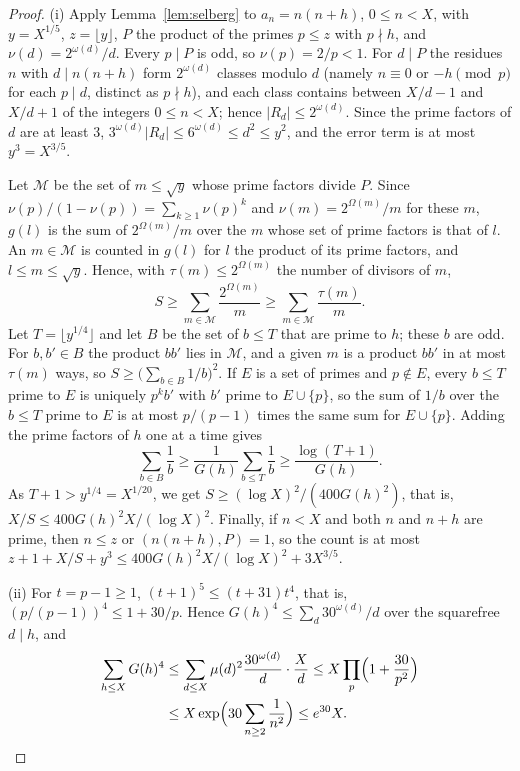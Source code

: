 \documentclass[screen,reqno]{aomart}
\numberwithin{equation}{section}
\theoremstyle{definition}
\begin{document}
\begin{proof}
(i) Apply Lemma~\ref{lem:selberg} to $a_n=n(n+h)$, $0\le n<X$, with $y=X^{1/5}$,
$z=\lfloor y\rfloor$, $P$ the product of the primes $p\le z$ with $p\nmid h$, and
$\nu(d)=2^{\omega(d)}/d$. Every $p\mid P$ is odd, so $\nu(p)=2/p<1$. For $d\mid P$ the residues $n$
with $d\mid n(n+h)$ form $2^{\omega(d)}$ classes modulo $d$ (namely $n\equiv0$ or $-h\pmod p$ for
each $p\mid d$, distinct as $p\nmid h$), and each class contains between $X/d-1$ and $X/d+1$ of
the integers $0\le n<X$; hence $|R_d|\le2^{\omega(d)}$. Since the prime factors of $d$ are at
least $3$, $3^{\omega(d)}|R_d|\le6^{\omega(d)}\le d^2\le y^2$, and the error term is at most
$y^3=X^{3/5}$.

Let $\mathcal M$ be the set of $m\le\sqrt y$ whose prime factors divide $P$. Since
$\nu(p)/(1-\nu(p))=\sum_{k\ge1}\nu(p)^k$ and $\nu(m)=2^{\Omega(m)}/m$ for these $m$, $g(l)$ is the
sum of $2^{\Omega(m)}/m$ over the $m$ whose set of prime factors is that of $l$. An $m\in\mathcal M$
is counted in $g(l)$ for $l$ the product of its prime factors, and $l\le m\le\sqrt y$. Hence,
with $\tau(m)\le2^{\Omega(m)}$ the number of divisors of $m$,
\[
  S\ge\sum_{m\in\mathcal M}\frac{2^{\Omega(m)}}m\ge\sum_{m\in\mathcal M}\frac{\tau(m)}m.
\]
Let $T=\lfloor y^{1/4}\rfloor$ and let $B$ be
the set of $b\le T$ that are prime to $h$; these $b$ are odd. For $b,b'\in B$ the product $bb'$
lies in $\mathcal M$, and a given $m$ is a product $bb'$ in at most $\tau(m)$ ways, so
$S\ge\bigl(\sum_{b\in B}1/b\bigr)^2$. If $E$ is a set of primes and $p\notin E$, every $b\le T$
prime to $E$ is uniquely $p^kb'$ with $b'$ prime to $E\cup\{p\}$, so the sum of $1/b$ over the
$b\le T$ prime to $E$ is at most $p/(p-1)$ times the same sum for $E\cup\{p\}$. Adding the prime
factors of $h$ one at a time gives
\[
  \sum_{b\in B}\frac1b\ge\frac1{G(h)}\sum_{b\le T}\frac1b\ge\frac{\log(T+1)}{G(h)}.
\]
As $T+1>y^{1/4}=X^{1/20}$, we get $S\ge(\log X)^2/(400G(h)^2)$, that is,
$X/S\le400G(h)^2X/(\log X)^2$. Finally, if $n<X$ and both $n$ and $n+h$ are prime, then
$n\le z$ or $(n(n+h),P)=1$, so the count is at most $z+1+X/S+y^3\le400G(h)^2X/(\log X)^2+3X^{3/5}$.

(ii) For $t=p-1\ge1$, $(t+1)^5\le(t+31)t^4$, that is, $(p/(p-1))^4\le1+30/p$. Hence
$G(h)^4\le\sum_d30^{\omega(d)}/d$ over the squarefree $d\mid h$, and
\begin{align*}
  \sum_{h\le X}G(h)^4&\le\sum_{d\le X}\mu(d)^2\frac{30^{\omega(d)}}d\cdot\frac Xd
  \le X\prod_p\Bigl(1+\frac{30}{p^2}\Bigr)\\
  &\le X\exp\Bigl(30\sum_{n\ge2}\frac1{n^2}\Bigr)\le e^{30}X.\qedhere
\end{align*}
\end{proof}
\end{document}
